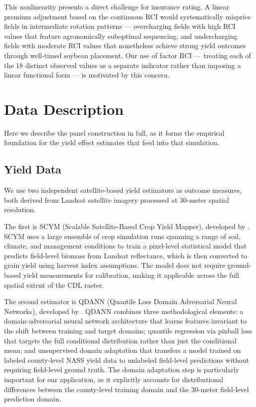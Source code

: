 \documentclass[12pt,letterpaper]{article}
\theoremstyle{remark}
\theoremstyle{plain}
\theoremstyle{definition}
\begin{document}
This nonlinearity presents a direct challenge for insurance rating. A linear premium adjustment based on the continuous RCI would systematically misprice fields in intermediate rotation patterns — overcharging fields with high RCI values that feature agronomically suboptimal sequencing, and undercharging fields with moderate RCI values that nonetheless achieve strong yield outcomes through well-timed soybean placement. Our use of factor RCI — treating each of the 18 distinct observed values as a separate indicator rather than imposing a linear functional form — is motivated by this concern. 

\section{\label{sec:data}Data Description}

Here we describe the panel construction in full, as it forms the empirical foundation for the yield effect estimates that feed into that simulation.

\subsection{\label{subsec:yield}Yield Data}
We use two independent satellite-based yield estimators as outcome measures, both derived from Landsat satellite imagery processed at 30-meter spatial resolution.

The first is SCYM (Scalable Satellite-Based Crop Yield Mapper), developed by \cite{lobell2015}. SCYM uses a large ensemble of crop simulation runs spanning a range of soil, climate, and management conditions to train a pixel-level statistical model that predicts field-level biomass from Landsat reflectance, which is then converted to grain yield using harvest index assumptions. The model does not require ground-based yield measurements for calibration, making it applicable across the full spatial extent of the CDL raster. 

The second estimator is QDANN (Quantile Loss Domain Adversarial Neural Networks), developed by \cite{Ma2024}. QDANN combines three methodological elements: a domain-adversarial neural network architecture that learns features invariant to the shift between training and target domains; quantile regression via pinball loss that targets the full conditional distribution rather than just the conditional mean; and unsupervised domain adaptation that transfers a model trained on labeled county-level NASS yield data to unlabeled field-level predictions without requiring field-level ground truth. The domain adaptation step is particularly important for our application, as it explicitly accounts for distributional differences between the county-level training domain and the 30-meter field-level prediction domain. 
\end{document}
